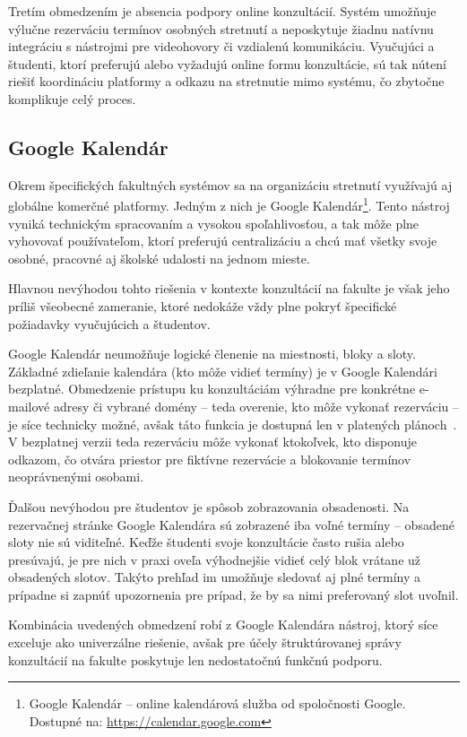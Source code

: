 Tretím obmedzením je absencia podpory online konzultácií. Systém umožňuje výlučne rezerváciu termínov osobných stretnutí a neposkytuje žiadnu natívnu integráciu s nástrojmi pre videohovory či vzdialenú komunikáciu. Vyučujúci a študenti, ktorí preferujú alebo vyžadujú online formu konzultácie, sú tak nútení riešiť koordináciu platformy a odkazu na stretnutie mimo systému, čo zbytočne komplikuje celý proces.

\subsection{Google Kalendár}
Okrem špecifických fakultných systémov sa na organizáciu stretnutí využívajú aj globálne komerčné platformy. Jedným z nich je Google Kalendár\footnote{Google Kalendár – online kalendárová služba od spoločnosti Google. Dostupné na: \url{https://calendar.google.com}}. Tento nástroj vyniká technickým spracovaním a vysokou spoľahlivosťou, a tak môže plne vyhovovať používateľom, ktorí preferujú centralizáciu a chcú mať všetky svoje osobné, pracovné aj školské udalosti na jednom mieste.

Hlavnou nevýhodou tohto riešenia v kontexte konzultácií na fakulte je však jeho príliš všeobecné zameranie, ktoré nedokáže vždy plne pokryť špecifické požiadavky vyučujúcich a študentov.

Google Kalendár neumožňuje logické členenie na miestnosti, bloky a sloty. Základné zdieľanie kalendára (kto môže vidieť termíny) je v Google Kalendári bezplatné. Obmedzenie prístupu ku konzultáciám výhradne pre konkrétne e-mailové adresy či vybrané domény – teda overenie, kto môže vykonať rezerváciu – je síce technicky možné, avšak táto funkcia je dostupná len v platených plánoch~\cite{google_appointment_booking}. V bezplatnej verzii teda rezerváciu môže vykonať ktokoľvek, kto disponuje odkazom, čo otvára priestor pre fiktívne rezervácie a blokovanie termínov neoprávnenými osobami.

Ďalšou nevýhodou pre študentov je spôsob zobrazovania obsadenosti. Na rezervačnej stránke Google Kalendára sú zobrazené iba voľné termíny – obsadené sloty nie sú viditeľné. Keďže študenti svoje konzultácie často rušia alebo presúvajú, je pre nich v praxi oveľa výhodnejšie vidieť celý blok vrátane už obsadených slotov. Takýto prehľad im umožňuje sledovať aj plné termíny a prípadne si zapnúť upozornenia pre prípad, že by sa nimi preferovaný slot uvoľnil. 

Kombinácia uvedených obmedzení robí z Google Kalendára nástroj, ktorý síce exceluje ako univerzálne riešenie, avšak pre účely štruktúrovanej správy konzultácií na fakulte poskytuje len nedostatočnú funkčnú podporu.

